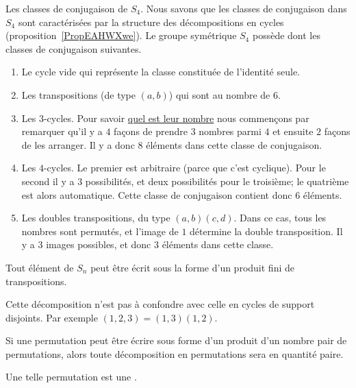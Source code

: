 \begin{example} \label{ExVYZPzub}
    Les classes de conjugaison de \( S_4\). Nous savons que les classes de conjugaison dans \( S_4\) sont caractérisées par la structure des décompositions en cycles (proposition~\ref{PropEAHWXwe}). Le groupe symétrique \( S_4\) possède dont les classes de conjugaison suivantes.
\begin{enumerate}
    \item
        Le cycle vide qui représente la classe constituée de l'identité seule.
    \item
        Les transpositions (de type \( (a,b)\)) qui sont au nombre de \( 6\).
    \item
        Les \( 3\)-cycles. Pour savoir \href{http://www.toujourspret.com/techniques/expression/chants/C/cantique_des_etoiles.php}{quel est leur nombre} nous commençons par remarquer qu'il y a \( 4\) façons de prendre \( 3\) nombres parmi \( 4\) et ensuite \( 2\) façons de les arranger. Il y a donc \( 8\) éléments dans cette classe de conjugaison.
    \item
        Les \( 4\)-cycles. Le premier est arbitraire (parce que c'est cyclique). Pour le second il y a \( 3\) possibilités, et deux possibilités pour le troisième; le quatrième est alors automatique. Cette classe de conjugaison contient donc \( 6\) éléments.
    \item       \label{ITEMooGCMYooKZgFHX}
        Les doubles transpositions, du type \( (a,b)(c,d)\). Dans ce cas, tous les nombres sont permutés, et l'image de $1$ détermine la double transposition. Il y a $3$ images possibles, et donc \( 3\) éléments dans cette classe.
\end{enumerate}
\end{example}

\begin{proposition} \label{PropPWIJbu}
    Tout élément de \( S_n\) peut être écrit sous la forme d'un produit fini de transpositions.
\end{proposition}
Cette décomposition n'est pas à confondre avec celle en cycles de support disjoints. Par exemple \( (1,2,3)=(1,3)(1,2)\).

\begin{propositionDef}\label{PROPooKRHEooAxtmRv}
    Si une permutation peut être écrire sous forme d'un produit d'un nombre pair de permutations, alors toute décomposition en permutations sera en quantité paire.

    Une telle permutation est une .
\end{propositionDef}

